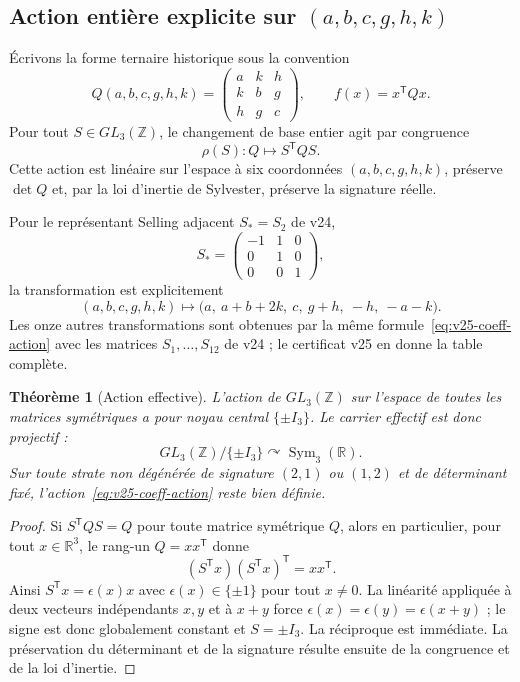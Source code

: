 \documentclass[11pt,a4paper]{article}
\newtheorem{theorem}{Théorème}[section]
\begin{document}
\subsection{Action entière explicite sur \texorpdfstring{$(a,b,c,g,h,k)$}{(a,b,c,g,h,k)}}

Écrivons la forme ternaire historique sous la convention
\begin{equation}\label{eq:v25-Qhist}
 \boxed{
 Q(a,b,c,g,h,k)
 =
 \begin{pmatrix}
 a&k&h\\
 k&b&g\\
 h&g&c
 \end{pmatrix},
 \qquad
 f(x)=x^{\mathsf T}Qx.}
\end{equation}
Pour tout $S\in GL_3(\mathbb Z)$, le changement de base entier agit par congruence
\begin{equation}\label{eq:v25-coeff-action}
 \boxed{
 \rho(S):Q\longmapsto S^{\mathsf T}QS.}
\end{equation}
Cette action est linéaire sur l'espace à six coordonnées $(a,b,c,g,h,k)$, préserve $\det Q$ et, par la loi d'inertie de Sylvester, préserve la signature réelle.

Pour le représentant Selling adjacent $S_*=S_2$ de v24,
\[
 S_*=\begin{pmatrix}-1&1&0\\0&1&0\\0&0&1\end{pmatrix},
\]
la transformation est explicitement
\begin{equation}\label{eq:v25-Sstar-coeff}
 \boxed{
 (a,b,c,g,h,k)
 \longmapsto
 \bigl(
 a,\ a+b+2k,\ c,\ g+h,\ -h,\ -a-k
 \bigr).}
\end{equation}
Les onze autres transformations sont obtenues par la même formule~\eqref{eq:v25-coeff-action} avec les matrices $S_1,\ldots,S_{12}$ de v24 ; le certificat v25 en donne la table complète.

\begin{theorem}[Action effective]
L'action de $GL_3(\mathbb Z)$ sur l'espace de toutes les matrices symétriques a pour noyau central $\{\pm I_3\}$. Le carrier effectif est donc projectif :
\[
 \boxed{
 GL_3(\mathbb Z)/\{\pm I_3\}
 \curvearrowright
 \operatorname{Sym}_3(\mathbb R).}
\]
Sur toute strate non dégénérée de signature $(2,1)$ ou $(1,2)$ et de déterminant fixé, l'action~\eqref{eq:v25-coeff-action} reste bien définie.
\end{theorem}

\begin{proof}
Si $S^{\mathsf T}QS=Q$ pour toute matrice symétrique $Q$, alors en particulier, pour tout $x\in\mathbb R^3$, le rang-un $Q=xx^{\mathsf T}$ donne
\[
 (S^{\mathsf T}x)(S^{\mathsf T}x)^{\mathsf T}=xx^{\mathsf T}.
\]
Ainsi $S^{\mathsf T}x=\epsilon(x)x$ avec $\epsilon(x)\in\{\pm1\}$ pour tout $x\ne0$. La linéarité appliquée à deux vecteurs indépendants $x,y$ et à $x+y$ force $\epsilon(x)=\epsilon(y)=\epsilon(x+y)$ ; le signe est donc globalement constant et $S=\pm I_3$. La réciproque est immédiate. La préservation du déterminant et de la signature résulte ensuite de la congruence et de la loi d'inertie.
\end{proof}
\end{document}

